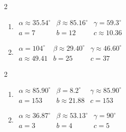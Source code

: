 \documentclass{ximera}
\begin{document}
	\author{Stitz-Zeager}


\begin{multicols}{2}

\begin{enumerate}

\item $\begin{array}{lll}
\alpha \approx 35.54^{\circ} & \beta \approx 85.16^{\circ} & \gamma = 59.3^{\circ} \\
a = 7 & b = 12 & c \approx 10.36 \end{array}$

\item $\begin{array}{lll}
\alpha = 104^{\circ} & \beta \approx 29.40^{\circ} & \gamma \approx 46.60^{\circ} \\
a \approx 49.41 & b = 25 & c = 37 \end{array}$

\setcounter{HW}{\value{enumi}}

\end{enumerate}

\end{multicols}

\begin{multicols}{2} 

\begin{enumerate}

\setcounter{enumi}{\value{HW}}

\item $\begin{array}{lll}
\alpha \approx 85.90^{\circ} & \beta = 8.2^{\circ} & \gamma \approx 85.90^{\circ} \\
a = 153 & b \approx 21.88 & c = 153 \end{array}$

\item $\begin{array}{lll}
\alpha \approx 36.87^{\circ} & \beta \approx 53.13^{\circ} & \gamma = 90^{\circ} \\
a = 3 & b = 4 & c = 5 \end{array}$

\setcounter{HW}{\value{enumi}}

\end{enumerate}

\end{multicols}
\end{document}
